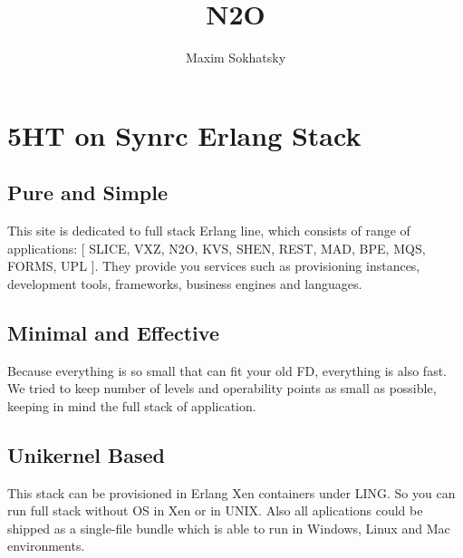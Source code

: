 
\renewcommand{\images}{http://synrc.space/images}

\title{N2O}
\author{Maxim Sokhatsky}



\section*{5HT on Synrc Erlang Stack}

\subsection*{Pure and Simple}
This site is dedicated to full stack Erlang line,
which consists of range of applications: [ SLICE, VXZ, N2O, KVS, SHEN, REST, MAD, BPE,
MQS, FORMS, UPL ]. They provide you services such as provisioning
instances, development tools, frameworks, business engines and languages.

\subsection*{Minimal and Effective}

Because everything is so small that can fit your old FD, everything is also fast.
We tried to keep number of levels and operability points as small as possible,
keeping in mind the full stack of application.

\subsection*{Unikernel Based}

This stack can be provisioned in Erlang Xen containers under LING.
So you can run full stack without OS in Xen or in UNIX. Also all
aplications could be shipped as a single-file bundle which is able
to run in Windows, Linux and Mac environments.


